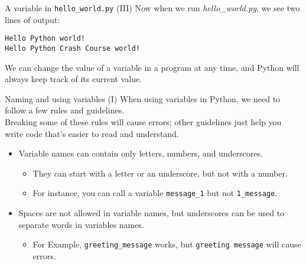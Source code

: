\documentclass[aspectratio=169]{beamer}
\begin{document}
\begin{frame}[fragile]{A variable in \texttt{hello\_world.py} (III)}
    Now when we run \textit{hello\_world.py}, we see two lines of output:
    \vspace{10pt}
    \begin{Verbatim}
Hello Python world!
Hello Python Crash Course world!
    \end{Verbatim}
    \vspace{10pt}
    We can change the value of a variable in a program at any time, and Python will always keep track of its current value.
\end{frame}


\begin{frame}{Naming and using variables (I)}
    When using variables in Python, we need to follow a few rules and guidelines. \\
    \vspace{10pt}
    Breaking some of these rules will cause errors; other guidelines just help you write code that's easier to read and understand.
    \vspace{10pt}
    \begin{itemize}[label=--]
        \item Variable names can contain only letters, numbers, and underscores.
            \begin{itemize}[label=\(\blacktriangleright\),itemsep=5pt]
                \item They can start with a letter or an underscore, but not with a number.
                \item For instance, you can call a variable \texttt{message\_1} but not \texttt{1\_message}.
            \end{itemize}
        \item Spaces are not allowed in variable names, but underscores can be used to separate words in variables names.
            \begin{itemize}[label=\(\blacktriangleright\),itemsep=5pt]
                \item For Example, \texttt{greeting\_message} works, but \texttt{greeting message} will cause errors.
            \end{itemize}
    \end{itemize}
\end{frame}
\end{document}
